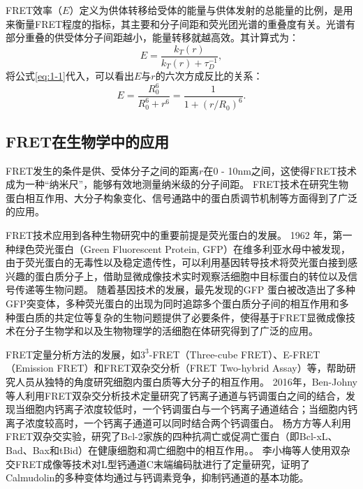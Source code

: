 FRET效率（$E$）定义为供体转移给受体的能量与供体发射的总能量的比例，是用来衡量FRET程度的指标，其主要和分子间距和荧光团光谱的重叠度有关。光谱有部分重叠的供受体分子间距越小，能量转移就越高效。其计算式为：
\begin{equation}
    {E}=\frac{k_T(r)}{k_T(r)+\tau^{-1}_{D}},
\end{equation}
将公式\ref{eq:1-1}代入，可以看出$E$与$r$的六次方成反比的关系：
\begin{equation}
    E=\frac{R_0^6}{R_0^6+r^6}=\frac{1}{1+(r/R_0)^6}.
\end{equation}

\subsection{FRET在生物学中的应用}

FRET发生的条件是供、受体分子之间的距离$r$在0 - 10nm之间，这使得FRET技术成为一种“纳米尺”，能够有效地测量纳米级的分子间距。
FRET技术在研究生物蛋白相互作用、大分子构象变化、信号通路中的蛋白质调节机制等方面得到了广泛的应用。

FRET技术应用到各种生物研究中的重要前提是荧光蛋白的发展。
1962 年，第一种绿色荧光蛋白（Green Fluorescent Protein, GFP）在维多利亚水母中被发现，由于荧光蛋白的无毒性以及稳定遗传性，可以利用基因转导技术将荧光蛋白接到感兴趣的蛋白质分子上，借助显微成像技术实时观察活细胞中目标蛋白的转位以及信号传递等生物问题。
随着基因技术的发展，最先发现的GFP 蛋白被改造出了多种GFP突变体，多种荧光蛋白的出现为同时追踪多个蛋白质分子间的相互作用和多种蛋白质的共定位等复杂的生物问题提供了必要条件，使得基于FRET显微成像技术在分子生物学和以及生物物理学的活细胞在体研究得到了广泛的应用。

FRET定量分析方法的发展，如$3^3$-FRET（Three-cube FRET）、E-FRET（Emission FRET）和FRET双杂交分析（FRET Two-hybrid Assay）等，帮助研究人员从独特的角度研究细胞内蛋白质等大分子的相互作用。
2016年，Ben-Johny等人利用FRET双杂交分析技术定量研究了钙离子通道与钙调蛋白之间的结合，发现当细胞内钙离子浓度较低时，一个钙调蛋白与一个钙离子通道结合；当细胞内钙离子浓度较高时，一个钙离子通道可以同时结合两个钙调蛋白。
杨方方等人利用FRET双杂交实验，研究了Bcl-2家族的四种抗凋亡或促凋亡蛋白（即Bcl-xL、Bad、Bax和tBid）在健康细胞和凋亡细胞中的相互作用。。
李小梅等人使用双杂交FRET成像等技术对L型钙通道C末端编码肽进行了定量研究，证明了Calmudolin的多种变体均通过与钙调素竞争，抑制钙通道的基本功能。

